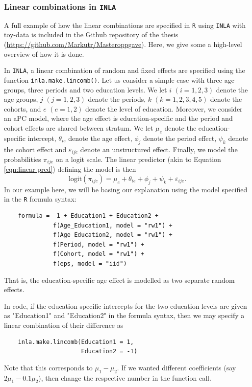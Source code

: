 \FloatBarrier
\subsubsection{Linear combinations in \texttt{INLA}}
\label{appendix:implementation:lincombs}
A full example of how the linear combinations are specified in \texttt{R} using \texttt{INLA} with toy-data is included in the Github repository of the thesis (\href{https://github.com/Markutr/Masteroppgave}{https://github.com/Markutr/Masteroppgave}). Here, we give some a high-level overview of how it is done.

In \texttt{INLA}, a linear combination of random and fixed effects are specified using the function \texttt{inla.make.lincomb()}. Let us consider a simple case with three age groups, three periods and two education levels. We let $i$ $(i= 1,2,3)$ denote the age groups, $j$ $(j= 1,2,3)$ denote the periods, $k$ $(k= 1,2,3,4,5)$ denote the cohorts, and $e$ $(e= 1,2)$ denote the level of education. Moreover, we consider an aPC model, where the age effect is education-specific and the period and cohort effects are shared between stratum. We let $\mu_e$ denote the education-specific intercept, $\theta_{ie}$ denote the age effect, $\phi_j$ denote the period effect, $\psi_k$ denote the cohort effect and $\varepsilon_{ije}$ denote an unstructured effect. Finally, we model the probabilities $\pi_{ije}$ on a logit scale. The linear predictor (akin to Equation \eqref{eqn:linear-pred}) defining the model is then
\begin{equation}
    \text{logit}(\pi_{ije}) = \mu_e + \theta_{ie} + \phi_j + \psi_k + \varepsilon_{ije}.
\end{equation}
In our example here, we will be basing our explanation using the model specified in the \texttt{R} formula syntax:
\begin{lstlisting}
    formula = -1 + Education1 + Education2 + 
              f(Age_Education1, model = "rw1") + 
              f(Age_Education2, model = "rw1") +
              f(Period, model = "rw1") +
              f(Cohort, model = "rw1") +
              f(eps, model = "iid")
\end{lstlisting}
That is, the education-specific age effect is modelled as two separate random effects. 

In code, if the education-specific intercepts for the two education levels are given as "Education1" and "Education2" in the formula syntax, then we may specify a linear combination of their difference as
\begin{lstlisting}
    inla.make.lincomb(Education1 = 1, 
                      Education2 = -1)
\end{lstlisting}
Note that this corresponds to $\mu_1 - \mu_2$. If we wanted different coefficients (say $2\mu_1 - 0.1\mu_2$), then change the respective number in the function call. 


